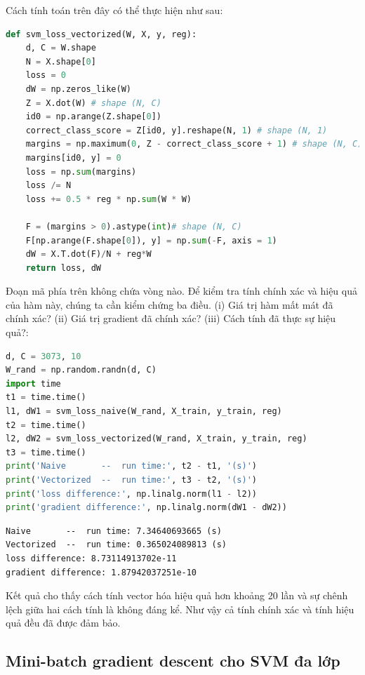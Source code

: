 Cách tính toán trên đây có thể thực hiện như sau:

\begin{lstlisting}[language=Python]
def svm_loss_vectorized(W, X, y, reg):
    d, C = W.shape
    N = X.shape[0]
    loss = 0
    dW = np.zeros_like(W)
    Z = X.dot(W) # shape (N, C)
    id0 = np.arange(Z.shape[0])
    correct_class_score = Z[id0, y].reshape(N, 1) # shape (N, 1)
    margins = np.maximum(0, Z - correct_class_score + 1) # shape (N, C)
    margins[id0, y] = 0
    loss = np.sum(margins)
    loss /= N
    loss += 0.5 * reg * np.sum(W * W)

    F = (margins > 0).astype(int)# shape (N, C)
    F[np.arange(F.shape[0]), y] = np.sum(-F, axis = 1)
    dW = X.T.dot(F)/N + reg*W
    return loss, dW
\end{lstlisting}

Đoạn mã phía trên không chứa vòng  nào. Để kiểm tra tính
chính xác và hiệu quả của hàm này, chúng ta cần kiểm chứng ba điều. (i) Giá trị
hàm mất mát đã chính xác? (ii) Giá trị gradient đã chính xác? (iii)
Cách tính đã thực sự hiệu quả?:
\begin{lstlisting}[language=Python]
d, C = 3073, 10
W_rand = np.random.randn(d, C)
import time
t1 = time.time()
l1, dW1 = svm_loss_naive(W_rand, X_train, y_train, reg)
t2 = time.time()
l2, dW2 = svm_loss_vectorized(W_rand, X_train, y_train, reg)
t3 = time.time()
print('Naive       --  run time:', t2 - t1, '(s)')
print('Vectorized  --  run time:', t3 - t2, '(s)')
print('loss difference:', np.linalg.norm(l1 - l2))
print('gradient difference:', np.linalg.norm(dW1 - dW2))
\end{lstlisting}
\kq
\begin{lstlisting}
Naive       --  run time: 7.34640693665 (s)
Vectorized  --  run time: 0.365024089813 (s)
loss difference: 8.73114913702e-11
gradient difference: 1.87942037251e-10
\end{lstlisting}
Kết quả cho thấy cách tính vector hóa hiệu quả hơn khoảng 20 lần và sự chênh lệch giữa hai cách tính là không đáng kể.
Như vậy cả tính chính xác và tính hiệu quả đều đã được đảm bảo.

\subsection{Mini-batch gradient descent cho SVM đa lớp}

